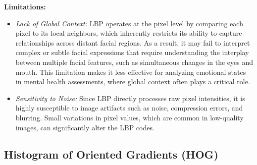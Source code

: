 \documentclass[lettersize,journal]{IEEEtran}
\begin{document}
\textbf{Limitations:}
\begin{itemize}
    \item \emph{Lack of Global Context:} LBP operates at the pixel level by comparing each pixel to its local neighbors, which inherently restricts its ability to capture relationships across distant facial regions. As a result, it may fail to interpret complex or subtle facial expressions that require understanding the interplay between multiple facial features, such as simultaneous changes in the eyes and mouth. This limitation makes it less effective for analyzing emotional states in mental health assessments, where global context often plays a critical role.
    \item \emph{Sensitivity to Noise:} Since LBP directly processes raw pixel intensities, it is highly susceptible to image artifacts such as noise, compression errors, and blurring. Small variations in pixel values, which are common in low-quality images, can significantly alter the LBP codes.
\end{itemize}

\subsection{Histogram of Oriented Gradients (HOG)}
\end{document}
